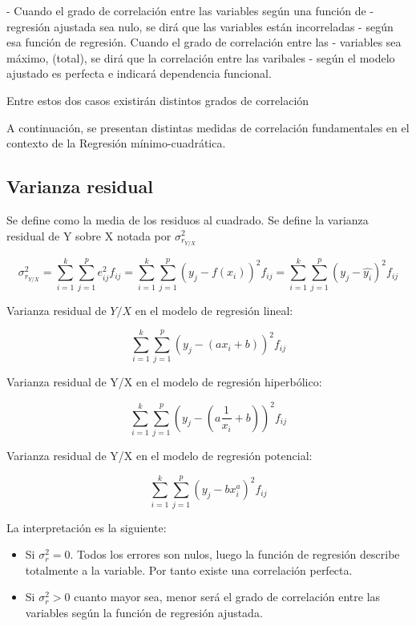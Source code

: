 \documentclass{article}
\theoremstyle{definition}
\begin{document}
- Cuando el grado de correlación entre las variables según una función de
- regresión ajustada sea nulo, se dirá que las variables están incorreladas
- según esa función de regresión. Cuando el grado de correlación entre las
- variables sea máximo, (total), se dirá que la correlación entre las varibales
- según el modelo ajustado es perfecta e indicará dependencia funcional.

Entre estos dos casos existirán distintos grados de correlación

A continuación, se presentan distintas medidas de correlación fundamentales en el
contexto de la Regresión mínimo-cuadrática.

\subsection{Varianza residual}

Se define como la media de los residuos al
cuadrado. Se define la varianza residual de Y sobre X notada por $\sigma_{r_{Y/X}}^2 $

$$
\sigma_{r_{Y/X}}^2 =
	\sum_{i=1}^k \sum_{j=1}^p e_{ij}^2 f_{ij} =
	\sum_{i=1}^k \sum_{j=1}^p {(y_j - f(x_i))}^2 f_{ij} =
	\sum_{i=1}^k \sum_{j=1}^p {(y_j -\hat{y_i})}^2 f_{ij}
$$

Varianza residual de $Y/X$ en el modelo de regresión lineal:

$$ \sum_{i=1}^k \sum_{j=1}^p {(y_j - (ax_i +b))}^2 f_{ij} $$

Varianza residual de Y/X en el modelo de regresión hiperbólico:

$$ \sum_{i=1}^k \sum_{j=1}^p {(y_j - (a\frac{1}{x_i} +b))}^2 f_{ij} $$

Varianza residual de Y/X en el modelo de regresión potencial:

$$\sum_{i=1}^k \sum_{j=1}^p {(y_j - bx_i^a)}^2 f_{ij} $$

La interpretación es la siguiente:

\begin{itemize}
\item Si $\sigma_r^2 = 0$. Todos los errores son nulos, luego la función de
  regresión describe totalmente a la variable. Por tanto existe una correlación
  perfecta.
\item Si $\sigma_r^2 > 0$ cuanto mayor sea, menor será el grado de correlación
entre las variables según la función de regresión ajustada.
\end{itemize}

\vspace{2mm}
\end{document}
